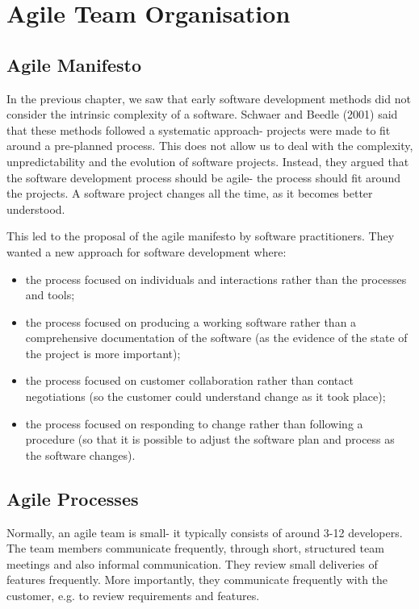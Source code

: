 \documentclass[a4paper, openany]{memoir}
\begin{document}
\chapter{Agile Team Organisation}
\section{Agile Manifesto}
In the previous chapter, we saw that early software development methods did not consider the intrinsic complexity of a software. Schwaer and Beedle (2001) said that these methods followed a systematic approach- projects were made to fit around a pre-planned process. This does not allow us to deal with the complexity, unpredictability and the evolution of software projects. Instead, they argued that the software development process should be agile- the process should fit around the projects. A software project changes all the time, as it becomes better understood. 

This led to the proposal of the agile manifesto by software practitioners. They wanted a new approach for software development where:
\begin{itemize}
    \item the process focused on individuals and interactions rather than the processes and tools;
    \item the process focused on producing a working software rather than a comprehensive documentation of the software (as the evidence of the state of the project is more important);
    \item the process focused on customer collaboration rather than contact negotiations (so the customer could understand change as it took place);
    \item the process focused on responding to change rather than following a procedure (so that it is possible to adjust the software plan and process as the software changes).
\end{itemize}

\section{Agile Processes}
Normally, an agile team is small- it typically consists of around 3-12 developers. The team members communicate frequently, through short, structured team meetings and also informal communication. They review small deliveries of features frequently. More importantly, they communicate frequently with the customer, e.g. to review requirements and features. 
\end{document}
